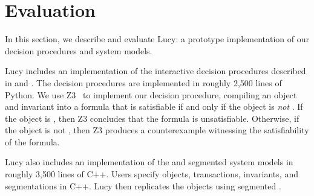 \section{Evaluation}
In this section, we describe and evaluate Lucy: a prototype implementation of
our decision procedures and system models.

Lucy includes an implementation of the interactive decision procedures
described in  and
. The decision procedures
are implemented in roughly 2,500 lines of Python.
%
%
We use Z3~\cite{de2008z3} to implement our \invariantclosure{} decision procedure,
compiling an object and invariant into a formula that is satisfiable if and
only if the object is \emph{not} \invariantclosed{}. If the object is
\invariantclosed{}, then Z3 concludes that the formula is unsatisfiable.
Otherwise, if the object is not \invariantclosed{}, then Z3 produces a
counterexample witnessing the satisfiability of the formula.

Lucy also includes an implementation of the \invariantconfluence{} and
segmented \invariantconfluence{} system models in roughly 3,500 lines of C++.
Users specify objects, transactions, invariants, and segmentations in C++. Lucy
then replicates the objects using segmented \invariantconfluence{}.

